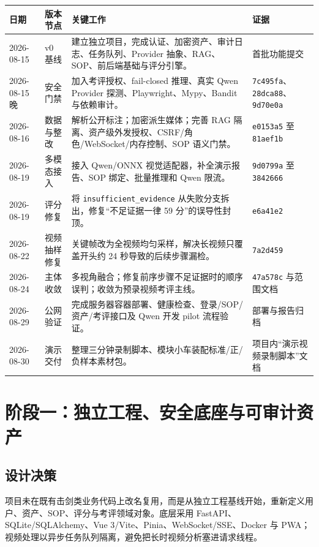\documentclass[UTF8,11pt,a4paper]{ctexart}
\begin{document}
\begin{longtable}{@{}p{22mm}p{24mm}p{78mm}p{28mm}@{}}
\toprule
\textbf{日期} & \textbf{版本节点} & \textbf{关键工作} & \textbf{证据}\\
\midrule
2026-08-15 & v0 基线 & 建立独立项目，完成认证、加密资产、审计日志、任务队列、Provider 抽象、RAG、SOP、前后端基础与评分引擎。 & 首批功能提交\\
2026-08-15 晚 & 安全门禁 & 加入考评授权、fail-closed 推理、真实 Qwen Provider 探测、Playwright、Mypy、Bandit 与依赖审计。 & \texttt{7c495fa}、\texttt{28dca88}、\texttt{9d70e0a}\\
2026-08-16 & 数据与整改 & 解析公开标注；加密派生媒体；完善 RAG 隔离、资产级外发授权、CSRF/角色/WebSocket/内存控制、SOP 语义门禁。 & \texttt{e0153a5} 至 \texttt{81aef1b}\\
2026-08-19 & 多模态接入 & 接入 Qwen/ONNX 视觉适配器，补全演示报告、SOP 绑定、批量推理和 Qwen 限流。 & \texttt{9d0799a} 至 \texttt{3842666}\\
2026-08-19 & 评分修复 & 将 \texttt{insufficient\_evidence} 从失败分支拆出，修复“不足证据一律 59 分”的误导性封顶。 & \texttt{e6a41e2}\\
2026-08-22 & 视频抽样修复 & 关键帧改为全视频均匀采样，解决长视频只覆盖开头约 24 秒导致的后续步骤漏检。 & \texttt{7a2d459}\\
2026-08-24 & 主体收敛 & 多视角融合；修复前序步骤不足证据时的顺序误判；收敛为预录视频考评主线。 & \texttt{47a578c} 与范围文档\\
2026-08-29 & 公网验证 & 完成服务器容器部署、健康检查、登录/SOP/资产/考评接口及 Qwen 开发 pilot 流程验证。 & 部署与报告归档\\
2026-08-30 & 演示交付 & 整理三分钟录制脚本、模块小车装配标准/正/负样本素材包。 & 项目内“演示视频录制脚本”文档\\
\bottomrule
\end{longtable}

\section{阶段一：独立工程、安全底座与可审计资产}
\subsection{设计决策}
项目未在既有击剑类业务代码上改名复用，而是从独立工程基线开始，重新定义用户、资产、SOP、评分与考评领域对象。底层采用 FastAPI、SQLite/SQLAlchemy、Vue 3/Vite、Pinia、WebSocket/SSE、Docker 与 PWA；视频处理以异步任务队列隔离，避免把长时视频分析塞进请求线程。
\end{document}
